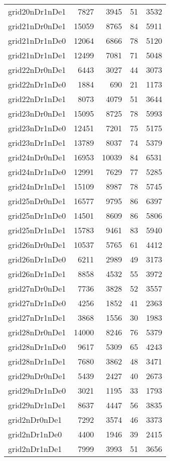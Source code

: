 \begin{longtable}{lrrrr}
grid20nDr1nDe1 & 7827 & 3945 & 51 & 3532 \\
grid21nDr0nDe1 & 15059 & 8765 & 84 & 5911 \\
grid21nDr1nDe0 & 12064 & 6866 & 78 & 5120 \\
grid21nDr1nDe1 & 12499 & 7081 & 71 & 5048 \\
grid22nDr0nDe1 & 6443 & 3027 & 44 & 3073 \\
grid22nDr1nDe0 & 1884 & 690 & 21 & 1173 \\
grid22nDr1nDe1 & 8073 & 4079 & 51 & 3644 \\
grid23nDr0nDe1 & 15095 & 8725 & 78 & 5993 \\
grid23nDr1nDe0 & 12451 & 7201 & 75 & 5175 \\
grid23nDr1nDe1 & 13789 & 8037 & 74 & 5379 \\
grid24nDr0nDe1 & 16953 & 10039 & 84 & 6531 \\
grid24nDr1nDe0 & 12991 & 7629 & 77 & 5285 \\
grid24nDr1nDe1 & 15109 & 8987 & 78 & 5745 \\
grid25nDr0nDe1 & 16577 & 9795 & 86 & 6397 \\
grid25nDr1nDe0 & 14501 & 8609 & 86 & 5806 \\
grid25nDr1nDe1 & 15783 & 9461 & 83 & 5940 \\
grid26nDr0nDe1 & 10537 & 5765 & 61 & 4412 \\
grid26nDr1nDe0 & 6211 & 2989 & 49 & 3173 \\
grid26nDr1nDe1 & 8858 & 4532 & 55 & 3972 \\
grid27nDr0nDe1 & 7736 & 3828 & 52 & 3557 \\
grid27nDr1nDe0 & 4256 & 1852 & 41 & 2363 \\
grid27nDr1nDe1 & 3868 & 1556 & 30 & 1983 \\
grid28nDr0nDe1 & 14000 & 8246 & 76 & 5379 \\
grid28nDr1nDe0 & 9617 & 5309 & 65 & 4243 \\
grid28nDr1nDe1 & 7680 & 3862 & 48 & 3471 \\
grid29nDr0nDe1 & 5439 & 2427 & 40 & 2673 \\
grid29nDr1nDe0 & 3021 & 1195 & 33 & 1793 \\
grid29nDr1nDe1 & 8637 & 4447 & 56 & 3835 \\
grid2nDr0nDe1 & 7292 & 3574 & 46 & 3373 \\
grid2nDr1nDe0 & 4400 & 1946 & 39 & 2415 \\
grid2nDr1nDe1 & 7999 & 3993 & 51 & 3656 \\

\end{longtable}
